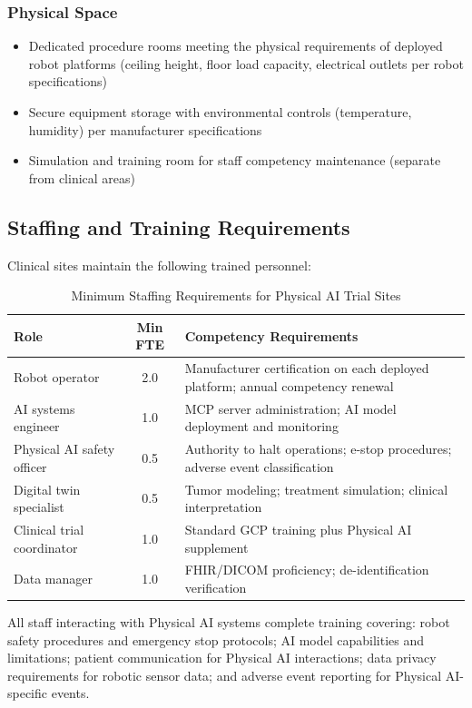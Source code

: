 \documentclass[11pt,letterpaper]{article}
\begin{document}
\subsubsection{Physical Space}

\begin{itemize}
  \item Dedicated procedure rooms meeting the physical requirements of deployed robot platforms (ceiling height, floor load capacity, electrical outlets per robot specifications)
  \item Secure equipment storage with environmental controls (temperature, humidity) per manufacturer specifications
  \item Simulation and training room for staff competency maintenance (separate from clinical areas)
\end{itemize}

\subsection{Staffing and Training Requirements}

Clinical sites \SHALL{} maintain the following trained personnel:

\begin{table}[H]
\centering
\caption{Minimum Staffing Requirements for Physical AI Trial Sites}
\small
\begin{tabularx}{\textwidth}{l c X}
\toprule
\textbf{Role} & \textbf{Min FTE} & \textbf{Competency Requirements} \\
\midrule
Robot operator & 2.0 & Manufacturer certification on each deployed platform; annual competency renewal \\
AI systems engineer & 1.0 & MCP server administration; AI model deployment and monitoring \\
Physical AI safety officer & 0.5 & Authority to halt operations; e-stop procedures; adverse event classification \\
Digital twin specialist & 0.5 & Tumor modeling; treatment simulation; clinical interpretation \\
Clinical trial coordinator & 1.0 & Standard GCP training plus Physical AI supplement \\
Data manager & 1.0 & FHIR/DICOM proficiency; de-identification verification \\
\bottomrule
\end{tabularx}
\end{table}

All staff interacting with Physical AI systems \SHALL{} complete training covering: robot safety procedures and emergency stop protocols; AI model capabilities and limitations; patient communication for Physical AI interactions; data privacy requirements for robotic sensor data; and adverse event reporting for Physical AI-specific events.
\end{document}
